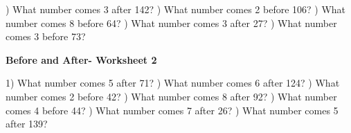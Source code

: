 \documentclass{article}%
\begin{document}
\newline%
\newline%
) What number comes 3 after 142?%
\newline%
\newline%
) What number comes 2 before 106?%
\newline%
\newline%
) What number comes 8 before 64?%
\newline%
\newline%
) What number comes 3 after 27?%
\newline%
\newline%
) What number comes 3 before 73?%
\newline%
\newline%
\newline%
\pagebreak%
\large%
\begin{center}%
\textbf{Before and After- Worksheet 2}%
\newline%
\newline%
\newline%
\end{center} \normalsize%
1) What number comes 5 after 71?%
\newline%
\newline%
) What number comes 6 after 124?%
\newline%
\newline%
) What number comes 2 before 42?%
\newline%
\newline%
) What number comes 8 after 92?%
\newline%
\newline%
) What number comes 4 before 44?%
\newline%
\newline%
) What number comes 7 after 26?%
\newline%
\newline%
) What number comes 5 after 139?%
\newline%
\end{document}
